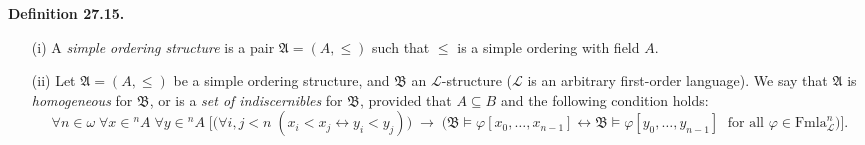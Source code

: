 \textbf{Definition 27.15.}
\begin{enumerate}
\item[(i)] A \textit{simple ordering structure} is a pair $\mathfrak{A} = (A, \leq)$ such that $\leq$ is a simple ordering with field $A$.
\item[(ii)] Let $\mathfrak{A} = (A, \leq)$ be a simple ordering structure, and $\mathfrak{B}$ an $\mathcal{L}$-structure ($\mathcal{L}$ is an arbitrary first-order language). We say that $\mathfrak{A}$ is \textit{homogeneous} for $\mathfrak{B}$, or is a \textit{set of indiscernibles} for $\mathfrak{B}$, provided that $A \subseteq B$ and the following condition holds:
$$
\forall n \in \omega \; \forall x \in {}^n\!A \; \forall y \in {}^n\!A \;
\Big[ \big(\forall i,j < n \;(x_i < x_j \leftrightarrow y_i < y_j)\big)
\;\longrightarrow\;
\big(\mathfrak{B} \models \varphi[x_0,\ldots,x_{n-1}] \leftrightarrow \mathfrak{B} \models \varphi[y_0,\ldots,y_{n-1}] \;\text{ for all } \varphi \in \mathrm{Fmla}^n_{\mathcal{L}}\big) \Big].
$$
\end{enumerate}
